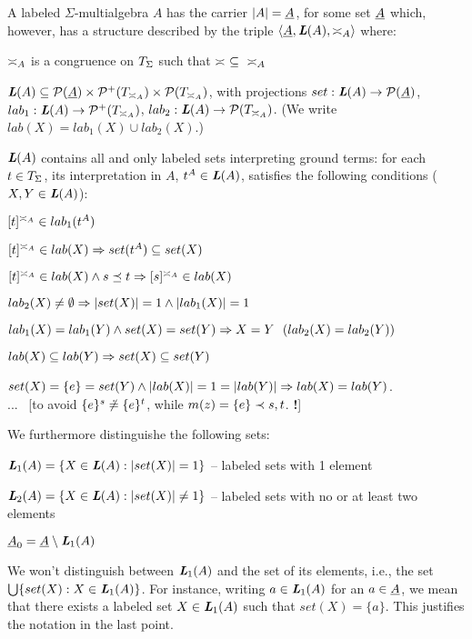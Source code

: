 \documentclass[10pt]{article}
\newcommand{\comt}[1]{... \ \hfill{\small{[#1 {\bf !}]}}}
\begin{document}
\begin{Definition}\label{de:labm}
A labeled $\Sigma$-multialgebra $A$ has the carrier $|A|=\underline {A}$, for some
set $\underline {A}$ which, however, has a structure described by the triple
$\langle\underline {A},\mbox{\bf{\em L}}(A), {\asymp_{A}}\rangle$ where:
\begin{ite}
\item ${\asymp_{A}}$ is a congruence on $T_{\Sigma}$ such that $\asymp\ \subseteq\ {\asymp_{A}}$ 
\item $\mbox{\bf{\em L}}(A)\subseteq{\mathcal{P}}(\underline {A})\times {\mathcal{P}}^+(T_{{\asymp_{A}}})\times {\mathcal{P}}(T_{{\asymp_{A}}})$, with projections
$set:\mbox{\bf{\em L}}(A)\rightarrow{\mathcal{P}}(\underline {A})$, $lab_1:\mbox{\bf{\em L}}(A)\rightarrow{\mathcal{P}}^+(T_{{\asymp_{A}}})$,  $lab_2:\mbox{\bf{\em L}}(A)\rightarrow{\mathcal{P}}(T_{{\asymp_{A}}})$. (We write $lab(X)=lab_1(X)\cup lab_2(X)$.)
\end{ite}
$\mbox{\bf{\em L}}(A)$ contains all and only labeled sets interpreting ground terms: for each
$t\in T_{\Sigma}$, its interpretation in $A$, $t^A\in\mbox{\bf{\em L}}(A)$,
satisfies the following conditions ($X,Y\in\mbox{\bf{\em L}}(A)$):
\begin{enum}
\item $[t]^{\asymp_{A}}\in lab_1(t^A)$
\item $[t]^{\asymp_{A}}\in lab(X) \Rightarrow set(t^A)\subseteq set(X)$
\item $[t]^{\asymp_{A}}\in lab(X) \land s\preceq t \Rightarrow [s]^{\asymp_{A}}\in lab(X)$
\item $lab_2(X)\not=\emptyset \Rightarrow |set(X)|=1 \land |lab_1(X)|=1$
\item $lab_1(X)=lab_1(Y)\land set(X)=set(Y) \Rightarrow X=Y\ \  (lab_2(X)=lab_2(Y))$
\item $lab(X)\subseteq lab(Y) \Rightarrow set(X)\subseteq set(Y)$
\item $set(X)=\{e\}=set(Y) \land |lab(X)|=1=|lab(Y)| \Rightarrow lab(X)=lab(Y)$.\\ 
\comt{to avoid $\{e\}^s \not\mathrel{\dot{=} } \{e\}^t$, while $m(z)=\{e\}\prec s, t$.}
\end{enum}
We furthermore distinguishe the following sets:
\begin{ite}
\item $\mbox{\bf{\em L}}_1(A)= \{ X\in\mbox{\bf{\em L}}(A) : |set(X)|=1\}$ -- labeled sets
with 1 element
\item $\mbox{\bf{\em L}}_2(A) = \{X\in\mbox{\bf{\em L}}(A):|set(X)|\not=1\}$ -- labeled sets with no or at least two elements
\item $\underline {A}_0=\underline {A}\setminus\mbox{\bf{\em L}}_1(A)$
\end{ite}
We won't distinguish between $\mbox{\bf{\em L}}_1(A)$ and the set of its elements, i.e., the
set $\bigcup\{set(X):X\in\mbox{\bf{\em L}}_1(A)\}$. For instance, 
writing $a\in\mbox{\bf{\em L}}_1(A)$ for an $a\in\underline {A}$, we mean that there exists a
labeled set $X\in\mbox{\bf{\em L}}_1(A)$ such that $set(X)=\{a\}$. This justifies the
notation in the last point. 


\end{Definition}
\end{document}
